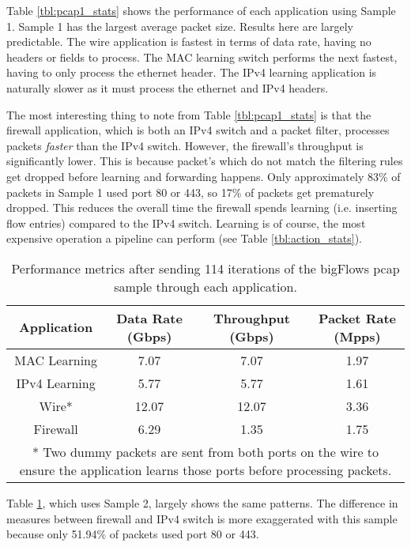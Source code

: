 Table \ref{tbl:pcap1_stats} shows the performance of each application using Sample 1. Sample 1 has the largest average packet size. Results here are largely predictable. The wire application is fastest in terms of data rate, having no headers or fields to process. The MAC learning switch performs the next fastest, having to only process the ethernet header. The IPv4 learning application is naturally slower as it must process the ethernet and IPv4 headers.

The most interesting thing to note from Table \ref{tbl:pcap1_stats} is that the firewall application, which is both an IPv4 switch and a packet filter, processes packets \textit{faster} than the IPv4 switch. However, the firewall's throughput is significantly lower. This is because packet's which do not match the filtering rules get dropped before learning and forwarding happens. Only approximately 83\% of packets in Sample 1 used port 80 or 443, so 17\% of packets get prematurely dropped. This reduces the overall time the firewall spends learning (i.e. inserting flow entries) compared to the IPv4 switch. Learning is of course, the most expensive operation a pipeline can perform (see Table \ref{tbl:action_stats}).

\begin{table}
\caption{Performance metrics after sending 114 iterations of the bigFlows pcap sample through each application.}
\begin{center}
\begin{tabularx}{0.9\textwidth}{| c || c | c | c | }
\hline
Application & Data Rate (Gbps) & Throughput (Gbps) & Packet Rate (Mpps)  \\
\hline
MAC Learning & 7.07 & 7.07 & 1.97  \\
\hline
IPv4 Learning & 5.77 & 5.77 & 1.61  \\
\hline 
Wire* & 12.07 & 12.07 & 3.36 \\
\hline
Firewall & 6.29 & 1.35 & 1.75 \\
\hline
\multicolumn{4}{p{0.9\textwidth}}{* Two dummy packets are sent from both ports on the wire to ensure the application learns those ports before processing packets.}
\end{tabularx}
\end{center}
\label{tbl:pcap2_stats}
\end{table}

Table \ref{tbl:pcap2_stats}, which uses Sample 2, largely shows the same patterns. 
The difference in measures between firewall and IPv4 switch is more exaggerated with this sample because only 51.94\% of packets used port 80 or 443.

